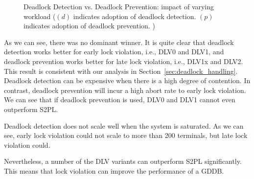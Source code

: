 \documentclass[conference]{IEEEtran}
\begin{document}
\begin{figure}[tbp]
  \centering



            

\caption{Deadlock Detection vs. Deadlock Prevention: impact of varying workload
($(d)$ indicates adoption of deadlock detection. $(p)$ indicates adoption of deadlock prevention. ) }
\label{fig:ycsb_deadlock}
\end{figure}

      
As we can see, there was no dominant winner. It is quite clear that deadlock detection works better for early lock violation, i.e., DLV0 and DLV1, 
and deadlock prevention works better for late lock violation, i.e., DLV1x and DLV2. This result is consistent with our analysis in Section~\ref{sec:deadlock_handling}.
Deadlock detection can be expensive when there is a high degree of contention. In contrast, deadlock prevention will incur a high abort rate to early lock violation.
We can see that if deadlock prevention is used, DLV0 and DLV1 cannot even outperform S2PL. 
\begin{highlighted}
Deadlock detection does not scale well when the system is saturated.
As we can see, early lock violation could not scale to more than 200 terminals, but late lock violation could.
\end{highlighted}
Nevertheless, a number of the DLV variants can outperform S2PL significantly. This means that lock violation can improve the performance of a GDDB.
\end{document}

